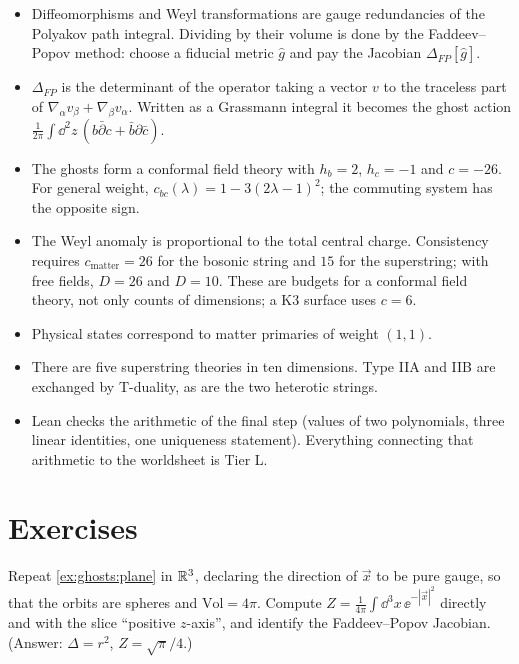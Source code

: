 \begin{summarybox}
\begin{itemize}[leftmargin=*,itemsep=2pt]
\item Diffeomorphisms and Weyl transformations are gauge redundancies of the Polyakov path
  integral. Dividing by their volume is done by the Faddeev--Popov method: choose a fiducial
  metric $\hat g$ and pay the Jacobian $\Delta_{FP}[\hat g]$.
\item $\Delta_{FP}$ is the determinant of the operator taking a vector $v$ to the traceless
  part of $\nabla_\alpha v_\beta+\nabla_\beta v_\alpha$. Written as a Grassmann integral it
  becomes the ghost action $\frac{1}{2\pi}\int\dd^2z\,(b\bar\partial c+\bar b\partial\bar c)$.
\item The ghosts form a conformal field theory with $h_b=2$, $h_c=-1$ and $c=-26$. For general
  weight, $c_{bc}(\lambda)=1-3(2\lambda-1)^2$; the commuting system has the opposite sign.
\item The Weyl anomaly is proportional to the total central charge. Consistency requires
  $c_{\mathrm{matter}}=26$ for the bosonic string and $15$ for the superstring; with free
  fields, $D=26$ and $D=10$. These are budgets for a conformal field theory, not only counts
  of dimensions; a K3 surface uses $c=6$.
\item Physical states correspond to matter primaries of weight $(1,1)$.
\item There are five superstring theories in ten dimensions. Type IIA and IIB are exchanged
  by T-duality, as are the two heterotic strings.
\item Lean checks the arithmetic of the final step (values of two polynomials, three linear
  identities, one uniqueness statement). Everything connecting that arithmetic to the
  worldsheet is Tier L.
\end{itemize}
\end{summarybox}

\section*{Exercises}

\begin{exercise}[$\star$]\label{exr:ghosts:plane3}
Repeat \cref{ex:ghosts:plane} in $\mathbb{R}^3$, declaring the direction of $\vec x$ to be pure
gauge, so that the orbits are spheres and $\mathrm{Vol}=4\pi$. Compute
$Z=\frac{1}{4\pi}\int\dd^3x\,\ee^{-|\vec x|^2}$ directly and with the slice ``positive
$z$-axis'', and identify the Faddeev--Popov Jacobian. (Answer: $\Delta=r^2$,
$Z=\sqrt\pi/4$.)
\end{exercise}

